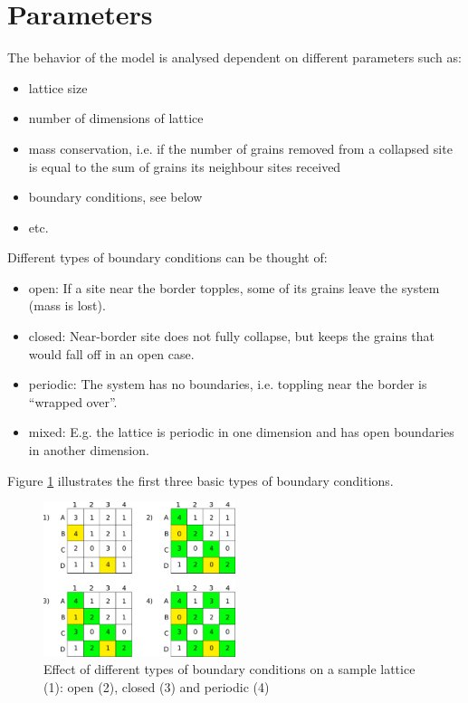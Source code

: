 \section{Parameters}
The behavior of the model is analysed dependent on different parameters such as:
\begin{itemize}
 \item lattice size
 \item number of dimensions of lattice
 \item mass conservation, i.e. if the number of grains removed from a collapsed site is equal to the sum of grains its neighbour sites received
 \item boundary conditions, see below
 \item etc.
\end{itemize}
Different types of boundary conditions can be thought of:
\begin{itemize}
 \item open: If a site near the border topples, some of its grains leave the system (mass is lost).
 \item closed: Near-border site does not fully collapse, but keeps the grains that would fall off in an open case.
 \item periodic: The system has no boundaries, i.e. toppling near the border is ``wrapped over''.
 \item mixed: E.g. the lattice is periodic in one dimension and has open boundaries in another dimension.
\end{itemize}
Figure \ref{pics:boundary} illustrates the first three basic types of boundary conditions.

\begin{figure}[!htpb]
\centering
\includegraphics[width=0.5\textwidth]{pics/pic4_boundary.pdf}
\caption[]{Effect of different types of boundary conditions on a sample lattice (1): open (2), closed (3) and periodic (4)}
\label{pics:boundary}
\end{figure}

